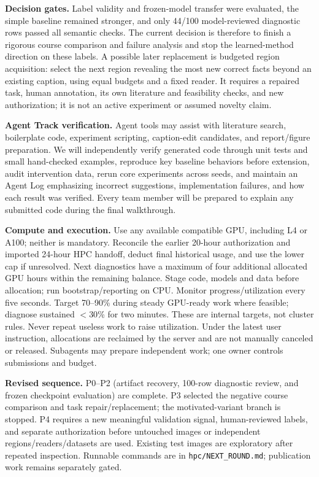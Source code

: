 \documentclass[10pt,twocolumn]{article}
\begin{document}
\textbf{Decision gates.} Label validity and frozen-model transfer were evaluated, the simple baseline remained stronger, and only 44/100 model-reviewed diagnostic rows passed all semantic checks. The current decision is therefore to finish a rigorous course comparison and failure analysis and stop the learned-method direction on these labels. A possible later replacement is budgeted region acquisition: select the next region revealing the most new correct facts beyond an existing caption, using equal budgets and a fixed reader. It requires a repaired task, human annotation, its own literature and feasibility checks, and new authorization; it is not an active experiment or assumed novelty claim.

\textbf{Agent Track verification.} Agent tools may assist with literature search, boilerplate code, experiment scripting, caption-edit candidates, and report/figure preparation. We will independently verify generated code through unit tests and small hand-checked examples, reproduce key baseline behaviors before extension, audit intervention data, rerun core experiments across seeds, and maintain an Agent Log emphasizing incorrect suggestions, implementation failures, and how each result was verified. Every team member will be prepared to explain any submitted code during the final walkthrough.

\textbf{Compute and execution.} Use any available compatible GPU, including L4 or A100; neither is mandatory. Reconcile the earlier 20-hour authorization and imported 24-hour HPC handoff, deduct final historical usage, and use the lower cap if unresolved. Next diagnostics have a maximum of four additional allocated GPU hours within the remaining balance. Stage code, models and data before allocation; run bootstrap/reporting on CPU. Monitor progress/utilization every five seconds. Target 70--90\% during steady GPU-ready work where feasible; diagnose sustained $<30$\% for two minutes. These are internal targets, not cluster rules. Never repeat useless work to raise utilization. Under the latest user instruction, allocations are reclaimed by the server and are not manually canceled or released. Subagents may prepare independent work; one owner controls submissions and budget.

\textbf{Revised sequence.} P0--P2 (artifact recovery, 100-row diagnostic review, and frozen checkpoint evaluation) are complete. P3 selected the negative course comparison and task repair/replacement; the motivated-variant branch is stopped. P4 requires a new meaningful validation signal, human-reviewed labels, and separate authorization before untouched images or independent regions/readers/datasets are used. Existing test images are exploratory after repeated inspection. Runnable commands are in \texttt{hpc/NEXT\_ROUND.md}; publication work remains separately gated.
\end{document}
